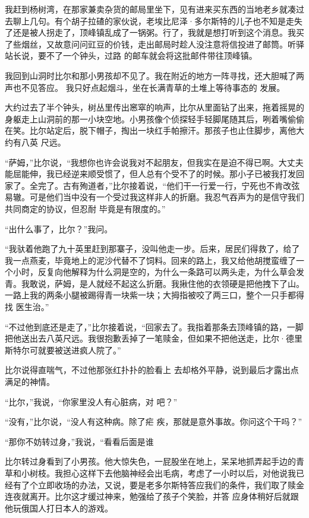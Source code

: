 \documentclass{article}
\begin{document}
我赶到杨树湾，在那家兼卖杂货的邮局里坐下，见有进来买东西的当地老乡就凑过去聊上几句。有个胡子拉碴的家伙说，老埃比尼泽·多尔斯特的儿子也不知是走失了还是被人拐走了，顶峰镇乱成了一锅粥。行了，我就是想打听到这个消息。我买了些烟丝，又故意问问豇豆的价钱，走出邮局时趁人没注意将信投进了邮筒。听驿站长说，要不了一个钟头，过路
的邮车就会将这批邮件带往顶峰镇。 

我回到山洞时比尔和那小男孩却不见了。我在附近的地方一阵寻找，还大胆喊了两声也不见答应。
\newpage
我只好点起烟斗，坐在长满青草的土堆上等待事态的
发展。 

大约过去了半个钟头，树丛里传出窸窣的响声，比尔从里面钻了出来，拖着摇晃的身躯走上山洞前的那一小块空地。小男孩像个侦探轻手轻脚尾随其后，咧着嘴偷偷在笑。比尔站定后，脱下帽子，掏出一块红手帕擦汗。那孩子也止住脚步，离他大约有八英
尺远。 

“萨姆，”比尔说，“我想你也许会说我对不起朋友，但我实在是迫不得已啊。大丈夫能屈能伸，我已经逆来顺受惯了，但人总有个受不了的时候。那小子已被我打发回家了。全完了。古有殉道者，”比尔接着说，“他们干一行爱一行，宁死也不肯改弦易辙。可是他们当中没有一个受过我这样非人的折磨。我忍气吞声为的是信守我们共同商定的协议，但忍耐
毕竟是有限度的。” 


“出什么事了，比尔？”我问。 

\newpage

“我驮着他跑了九十英里赶到那寨子，没叫他走一步。后来，居民们得救了，给了我一点燕麦，毕竟地上的泥沙代替不了饲料。回来的路上，我又给他胡搅蛮缠了一个小时，反复向他解释为什么洞是空的，为什么一条路可以两头走，为什么草会发青。我敢说，萨姆，是人就经不起这么折磨。我揪住他的衣领硬是把他拽下了山。一路上我的两条小腿被踢得青一块紫一块；大拇指被咬了两三口，整个一只手都得找
医生治。” 

“不过他到底还是走了，”比尔接着说，“回家去了。我指着那条去顶峰镇的路，一脚把他送出去八英尺远。我很抱歉丢掉了一笔赎金，但如果不把他送走，比尔·德里斯特尔可就要被送进疯人院了。”

比尔说得直喘气，不过他那张红扑扑的脸看上
去却格外平静，说到最后才露出点满足的神情。 

“比尔，”我说，“你家里没人有心脏病，对
吧？” 

\newpage

“没有，”比尔说，“没人有这种病。除了疟
疾，那就是意外事故。你问这个干吗？” 

“那你不妨转过身，”我说，“看看后面是谁

比尔转过身看到了小男孩。他大惊失色，一屁股坐在地上，呆呆地抓弄起手边的青草和小树枝。我担心这样下去他脑神经会出毛病，考虑了一小时以后，对他说我已经有了个立即收场的办法，又说，要是老多尔斯特答应我们的条件，我们取了赎金连夜就离开。比尔这才缓过神来，勉强给了孩子个笑脸，并答
应身体稍好后就跟他玩俄国人打日本人的游戏。 
\end{document}
